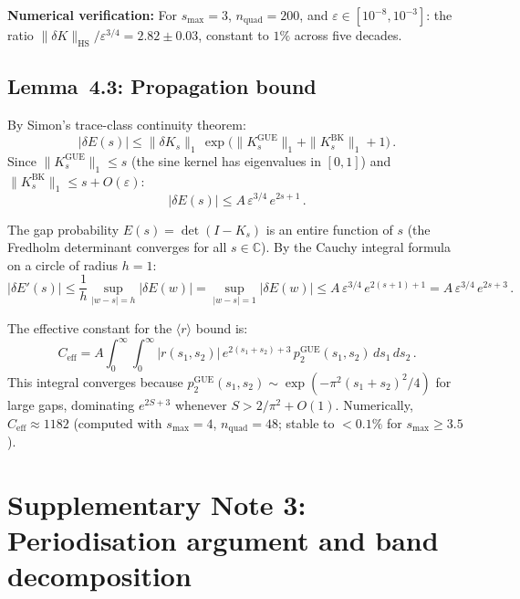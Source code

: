 \documentclass[10pt]{article}
\theoremstyle{remark}
\begin{document}
\textbf{Numerical verification:}
For $s_{\max} = 3$, $n_{\mathrm{quad}} = 200$, and
$\varepsilon \in [10^{-8}, 10^{-3}]$:
the ratio $\|\delta K\|_{\mathrm{HS}} / \varepsilon^{3/4} = 2.82 \pm 0.03$,
constant to $1\%$ across five decades.

\subsection{Lemma~4.3: Propagation bound}

By Simon's trace-class continuity theorem:
\begin{equation}
|\delta E(s)| \leq \|\delta K_s\|_1\,
\exp\bigl(\|K_s^{\mathrm{GUE}}\|_1 + \|K_s^{\mathrm{BK}}\|_1 + 1\bigr)\,.
\end{equation}
Since $\|K_s^{\mathrm{GUE}}\|_1 \leq s$ (the sine kernel has eigenvalues
in $[0,1]$) and $\|K_s^{\mathrm{BK}}\|_1 \leq s + O(\varepsilon)$:
\begin{equation}
|\delta E(s)| \leq A\,\varepsilon^{3/4}\,e^{2s + 1}\,.
\end{equation}

The gap probability $E(s) = \det(I - K_s)$ is an entire function of $s$
(the Fredholm determinant converges for all $s \in \mathbb{C}$). By the
Cauchy integral formula on a circle of radius $h = 1$:
\begin{equation}
|\delta E'(s)| \leq \frac{1}{h} \sup_{|w - s| = h} |\delta E(w)|
= \sup_{|w - s| = 1} |\delta E(w)|
\leq A\,\varepsilon^{3/4}\,e^{2(s+1)+1}
= A\,\varepsilon^{3/4}\,e^{2s+3}\,.
\end{equation}

The effective constant for the $\langle r\rangle$ bound is:
\begin{equation}
C_{\mathrm{eff}} = A \int_0^\infty\!\!\int_0^\infty |r(s_1, s_2)|\,
e^{2(s_1 + s_2) + 3}\,p_2^{\mathrm{GUE}}(s_1, s_2)\,ds_1\,ds_2\,.
\end{equation}
This integral converges because $p_2^{\mathrm{GUE}}(s_1, s_2) \sim
\exp(-\pi^2(s_1 + s_2)^2/4)$ for large gaps, dominating $e^{2S + 3}$
whenever $S > 2/\pi^2 + O(1)$. Numerically,
$C_{\mathrm{eff}} \approx 1182$ (computed with $s_{\max} = 4$,
$n_{\mathrm{quad}} = 48$; stable to $< 0.1\%$ for $s_{\max} \geq 3.5$).


\section{Supplementary Note 3: Periodisation argument and band
decomposition}
\end{document}
